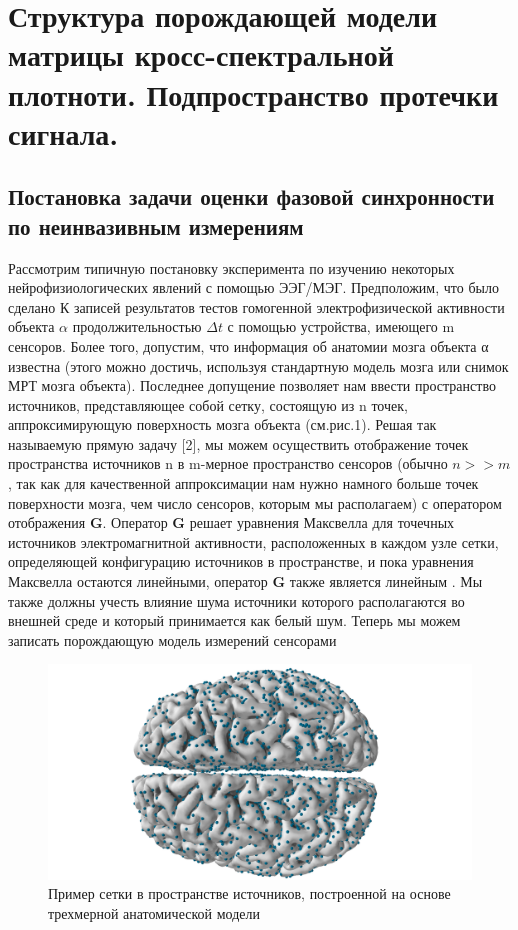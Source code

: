 \chapter{Структура порождающей модели матрицы кросс-спектральной плотноти. 
         Подпространство протечки сигнала.} \label{chapt1}

\section{Постановка задачи оценки фазовой синхронности по неинвазивным измерениям} \label{sect1_1}


Рассмотрим типичную постановку эксперимента по изучению некоторых
нейрофизиологических явлений с помощью ЭЭГ/МЭГ.
Предположим, что было сделано $К$ записей результатов тестов гомогенной электрофизической
активности объекта $\alpha$ продолжительностью $\Delta t$ с помощью устройства, имеющего m сенсоров.
Более того, допустим, что информация об анатомии мозга объекта α известна (этого можно достичь,
используя стандартную модель мозга или снимок МРТ мозга объекта).
Последнее допущение позволяет нам ввести пространство источников, представляющее собой сетку,
состоящую из n точек, аппроксимирующую поверхность мозга объекта (см.рис.1).
Решая так называемую прямую задачу [2], мы можем осуществить отображение точек пространства
источников n в m-мерное пространство сенсоров
(обычно $n >> m$, так как для качественной аппроксимации нам нужно намного
больше точек поверхности мозга, чем число сенсоров, которым мы располагаем)
с оператором отображения $\mathbf{G}$.
Оператор $\mathbf{G}$ решает уравнения Максвелла для точечных источников электромагнитной активности,
расположенных в каждом узле сетки, определяющей конфигурацию источников в пространстве,
и пока уравнения Максвелла остаются линейными, оператор $\mathbf{G}$ также является линейным \cite{Hamalainen1993}.
Мы также должны учесть влияние шума источники которого располагаются во внешней среде
и который принимается как белый шум.
Теперь мы можем записать порождающую модель измерений сенсорами

\begin{figure}
\centering
\includegraphics[scale=0.3]{../images/brain.png}
\caption{ Пример сетки в пространстве источников,
          построенной на основе трехмерной анатомической модели}
\label{fig:src_space}
\end{figure}

